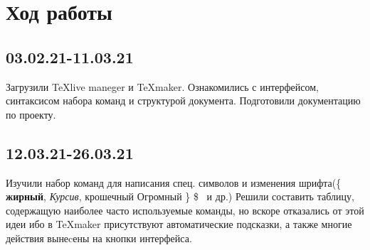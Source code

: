 \documentclass[14pt, a4paper]{extarticle}
\begin{document}
\section{Ход работы}

\subsection{03.02.21-11.03.21}
Загрузили \TeX live maneger и \TeX maker. Ознакомились с интерфейсом, синтаксисом набора команд и структурой документа. Подготовили документацию по проекту.

\subsection{12.03.21-26.03.21}
Изучили набор команд для написания спец. символов и изменения шрифта(\{ \textbf{жирный}, \textsl{Курсив}, {\tiny крошечный} {\Huge Огромный} \} \$ \texteuro \   и др.)
Решили составить таблицу, содержащую наиболее часто используемые команды, но вскоре отказались от этой идеи ибо в \TeX maker присутствуют автоматические подсказки, а также многие действия вынеcены на кнопки интерфейса. 
\end{document}
